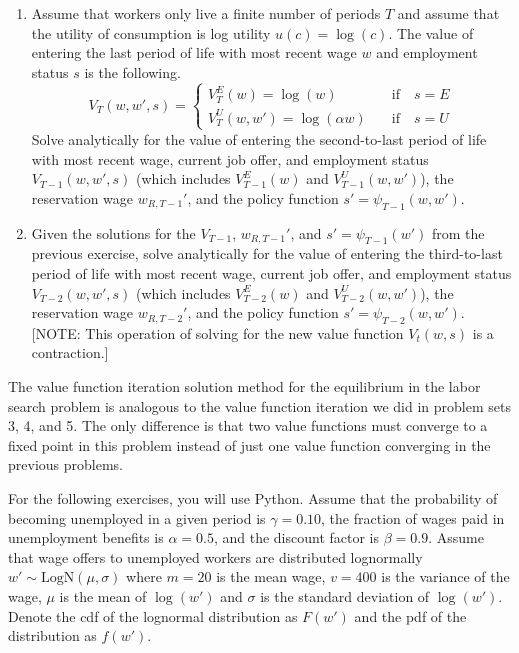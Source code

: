\begin{enumerate}
   
   \item Assume that workers only live a finite number of periods $T$ and assume that the utility of consumption is log utility $u(c) = \log(c)$. The value of entering the last period of life with most recent wage $w$ and employment status $s$ is the following.
   \begin{equation*}
      V_T(w,w',s) = \begin{cases}
                    V^E_T(w) = \log(w) \quad&\text{if}\quad s = E \\
                    V^U_T(w,w') = \log(\alpha w) \quad&\text{if}\quad s = U
                 \end{cases}
   \end{equation*}
   Solve analytically for the value of entering the second-to-last period of life with most recent wage, current job offer, and employment status $V_{T-1}(w,w',s)$ (which includes $V^E_{T-1}(w)$ and $V^U_{T-1}(w,w')$), the reservation wage $w_{R,T-1}'$, and the policy function $s' = \psi_{T-1}(w,w')$.
   
   \item Given the solutions for the $V_{T-1}$, $w_{R,T-1}'$, and $s'=\psi_{T-1}(w')$ from the previous exercise, solve analytically for the value of entering the third-to-last period of life with most recent wage, current job offer, and employment status $V_{T-2}(w,w',s)$ (which includes $V^E_{T-2}(w)$ and $V^U_{T-2}(w,w')$), the reservation wage $w_{R,T-2}'$, and the policy function $s' = \psi_{T-2}(w,w')$. [NOTE: This operation of solving for the new value function $V_t(w,s)$ is a contraction.]
   
\end{enumerate}

The value function iteration solution method for the equilibrium in the labor search problem is analogous to the value function iteration we did in problem sets 3, 4, and 5. The only difference is that two value functions must converge to a fixed point in this problem instead of just one value function converging in the previous problems.

For the following exercises, you will use Python. Assume that the probability of becoming unemployed in a given period is $\gamma = 0.10$, the fraction of wages paid in unemployment benefits is $\alpha = 0.5$, and the discount factor is $\beta = 0.9$. Assume that wage offers to unemployed workers are distributed lognormally $w'\sim \text{LogN}(\mu,\sigma)$ where $m=20$ is the mean wage, $v=400$ is the variance of the wage, $\mu$ is the mean of $\log(w')$ and $\sigma$ is the standard deviation of $\log(w')$. Denote the cdf of the lognormal distribution as $F(w')$ and the pdf of the distribution as $f(w')$.


